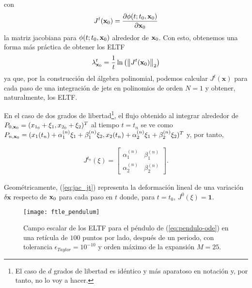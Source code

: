con 
\begin{equation}
 J^t(\mathbf{x}_0) = \frac{\partial \phi(t;t_0,\mathbf{x}_0)}{\partial \mathbf{x}_{0}}
 \label{eq:jacobian}
\end{equation}
la matriz jacobiana para $\phi(t;t_0,\mathbf{x}_0)$ alrededor de $\mathbf{x}_0$. Con esto, obtenemos una forma más práctica de obtener los ELTF
\begin{equation}
 \lambda_{\mathbf{x}_0}^t = \frac{1}{t}\ln \left( \left\lVert J^t(\mathbf{x}_0) \right\rVert_2 \right)
\end{equation}
ya que, por la construcción del álgebra polinomial, podemos calcular $J^t(\mathbf{x})$ para cada paso de una integración de jets en polinomios de orden $N=1$ y obtener, naturalmente, los ELTF.

En el caso de dos grados de libertad\footnote{El caso de $d$ grados de libertad es idéntico y más aparatoso en notación y, por tanto, no lo voy a hacer.}, el flujo obtenido al integrar alrededor de $P_{0,\mathbf{x}_0} = (x_{1_0} + \xi_1, x_{2_0} + \xi_2 )^T$ al tiempo $t=t_n$ se ve como $P_{n,\mathbf{x}_0} = (x_1(t_n) + \alpha_1^{(n)} \xi_1 + \beta_1^{(n)} \xi_2, x_2(t_n) + \alpha_2^{(n)} \xi_1 + \beta_2^{(n)} \xi_2)^T$ y, por tanto, 

\begin{align}
 J^{t_n}(\xi) = \left[ \begin{array}{ccc}
 \alpha_1^{(n)} & \beta_1^{(n)}  \\
 \alpha_2^{(n)} & \beta_2^{(n)}
 \end{array} \right].
 \label{eq:jac_jt}
\end{align}

Geométricamente, (\ref{eq:jac_jt}) representa la deformación lineal de una variación $\delta \mathbf{x}$ respecto de $\mathbf{x}_0$ para cada paso en $t$ donde, para $t = t_0$, $J^0(\xi) = \mathbf{1}$.


\begin{figure}[h!]
 \centering
 \texttt{[image: ftle\_pendulum]}
 \caption{Campo escalar de los ELTF para el péndulo de (\ref{eq:pendulo-ode}) en una retícula de $100$ puntos por lado, después de un periodo, con tolerancia $\epsilon_{Taylor} = 10^{-10}$ y orden máximo de la expansión $M = 25$.}
 \label{fig:ftle_pendulum}
\end{figure}

